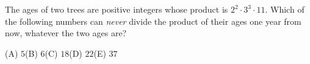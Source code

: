 The ages of two trees are positive integers whose product is $2^2\cdot3^3\cdot11$. Which of the following numbers can \emph{never} divide the product of their ages one year from now, whatever the two ages are?

(A) $5$\qquad (B) $6$\qquad (C) $18$\qquad (D) $22$\qquad (E) $37$

